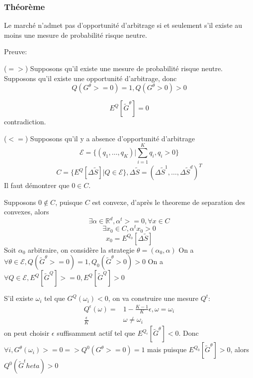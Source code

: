 \documentclass{article}
\begin{document}
\subsubsection{Th\'eor\`eme}
Le march\'e n'admet pas d'opportunit\'e d'arbitrage si et seulement s'il existe au moins une mesure de probabilit\'e risque neutre.

Preuve:

($=>$) Supposons qu'il existe une mesure de probabilit\'e risque neutre. Supposons qu'il existe une opportunit\'e d'arbitrage, donc 
\begin{equation}
Q(G^\theta>=0)=1, Q(G^\theta>0)>0
\end{equation}

\begin{equation}
E^Q[\tilde{G}^\theta]=0
\end{equation}
contradiction.

($<=$) Supposons qu'il y a absence d'opportunit\'e d'arbitrage
\begin{equation}
\mathcal{E}=\{(q_1,\ldots,q_K)|\sum_{i=1}^K q_i, q_i>0\}
\end{equation}
\begin{equation}
C=\{E^Q[\Delta\tilde{S}]|Q\in\mathcal{E}\}, \Delta \tilde{S}=(\Delta \tilde{S}^1,\ldots, \Delta\tilde{S}^d)^T
\end{equation}
Il faut d\'emontrer que $0\in C$.

Supposons $0\notin C$, puisque $C$ est convexe, d'apr\`es le theoreme de separation des convexes, alors 
\begin{equation}
\exists \alpha \in \mathbb{R}^d, \alpha^t >= 0, \forall x\in C
\end{equation}
\begin{equation}
\exists x_0\in C, \alpha^t x_0 > 0
\end{equation}
\begin{equation}
x_0=E^{Q_0}[\Delta\tilde{S}]
\end{equation}
Soit $\alpha_0$ arbitraire, on consid\`ere la strategie $\theta=(\alpha_0, \alpha)$
On a $\forall \theta\in\mathcal{E}, Q(\tilde{G}^\theta>=0)=1, Q_0(\tilde{G}^\theta>0)>0$
On a $\forall Q\in\mathcal{E}, E^Q[\tilde{G}^Q]>=0, E^Q[\tilde{G}^Q]>0$

S'il existe $\omega_i$ tel que $G^Q(\omega_i)<0$, on va construire une mesure $Q^t$:
\begin{equation}
\begin{split}
	Q^\epsilon(\omega)= & 1-\frac{K-1}{K}\epsilon , \omega = \omega_i \\
	\frac{\epsilon}{K} & \omega\neq \omega_i
\end{split}
\end{equation}
on peut choisir $\epsilon$ suffisamment actif tel que $E^{Q_\epsilon}[\tilde{G}^{\theta}]<0$. Donc $\forall i, G^\theta(\omega_i)>=0 => Q^0(G^\theta>=0)=1$ mais puisque $E^{Q_0}[\tilde{G}^\theta]>0$, alors $Q^0(\tilde{G}^theta)>0$
\end{document}
